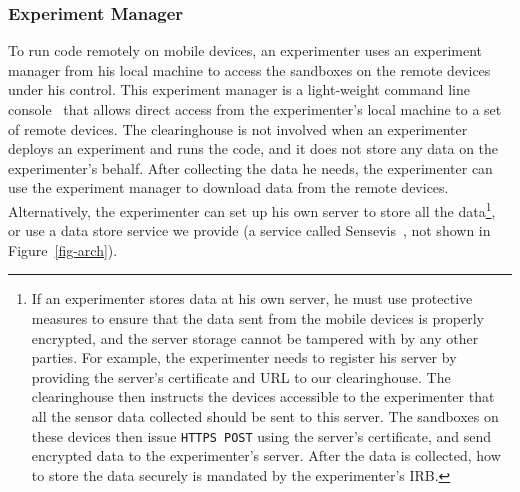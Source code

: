 \subsubsection{Experiment Manager}\label{sec-emt}

To run code remotely on mobile devices, an experimenter uses an
experiment manager from his local machine 
to access the sandboxes on the remote devices under his control. 
This experiment manager is a light-weight command line 
console~\cite{demo-kit} that allows direct access from the 
experimenter's local machine to a set of remote devices. 
The clearinghouse is not involved when an experimenter deploys 
an experiment and runs the code, and it does not store any
data on the experimenter's behalf. After collecting the data he needs, the
experimenter can use the experiment manager to download data from the remote devices. 
Alternatively, the experimenter can set up his own server to store all 
the data\footnote{\scriptsize
If an experimenter stores data at his own server, he must use protective
measures to ensure that the data sent from the mobile devices is
properly encrypted, and the server storage cannot be tampered
with by any other parties. For example, the experimenter needs to register
his server by providing the server's certificate and URL to our
clearinghouse. The clearinghouse then instructs the devices
accessible to the experimenter that all the sensor data collected should be
sent to this server. The sandboxes on these devices then issue
\texttt{HTTPS POST} using the server's certificate, and send encrypted
data to the experimenter's server. After the data is collected, how to store
the data securely is mandated by the experimenter's IRB.}, or use a data 
store service we provide (a service called Sensevis~\cite{sensevis}, 
not shown in Figure~\ref{fig-arch}).

